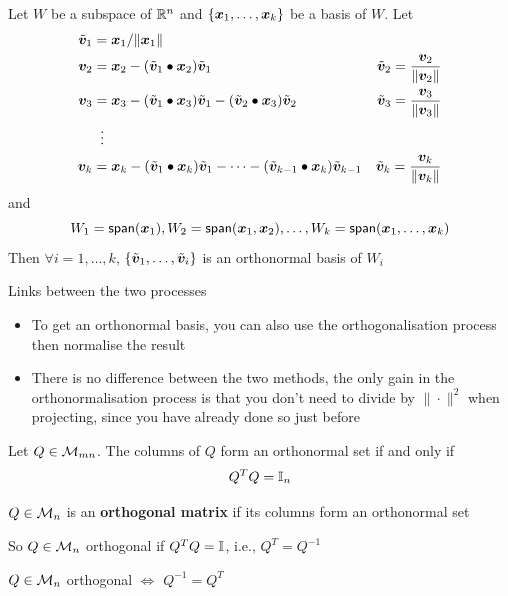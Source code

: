 \documentclass[aspectratio=169]{beamer}\usepackage[]{graphicx}\usepackage[]{xcolor}
\begin{document}
\begin{frame}
\begin{importanttheorem}
Let $W$ be a subspace of $\mathbb{R}^n$ and $\{\bm{x}_1,\ldots,\bm{x}_k\}$ be a basis of $W$. 
Let
\begin{align*}
\tilde{\bm{v}}_1 &= \bm{x}_1/\|\bm{x}_1\| \\
\bm{v}_2 &= \bm{x}_2 -(\tilde{\bm{v}}_1\bullet\bm{x}_2)\tilde{\bm{v}}_1  &
\tilde{\bm{v}}_2 = \frac{\bm{v}_2}{\|\bm{v}_2\|} \\
\bm{v}_3 &= \bm{x}_3 -(\tilde{\bm{v}}_1\bullet\bm{x}_3)\tilde{\bm{v}}_1 -(\tilde{\bm{v}}_2\bullet\bm{x}_3)\tilde{\bm{v}}_2 &
\tilde{\bm{v}}_3 = \frac{\bm{v}_3}{\|\bm{v}_3\|} \\
&\;\;\vdots & \\
\bm{v}_k &= \bm{x}_k -(\tilde{\bm{v}}_1\bullet\bm{x}_k)\tilde{\bm{v}}_1 
-\cdots-(\tilde{\bm{v}}_{k-1}\bullet\bm{x}_k)\tilde{\bm{v}}_{k-1}
& \tilde{\bm{v}}_k = \frac{\bm{v}_k}{\|\bm{v}_k\|}
\end{align*}
and
\[
W_1=\mathsf{span}(\bm{x}_1),W_2 = \mathsf{span}(\bm{x}_1,\bm{x}_2),\ldots,
W_k = \mathsf{span}(\bm{x}_1,\ldots,\bm{x}_k)
\]
Then $\forall i=1,\ldots,k$, $\{\tilde{\bm{v}}_1,\ldots,\tilde{\bm{v}}_i\}$ is an orthonormal basis of $W_i$
\end{importanttheorem}
\end{frame}

\begin{frame}{Links between the two processes}
\begin{itemize}
\item To get an orthonormal basis, you can also use the orthogonalisation process then normalise the result
\vfill
\item There is no difference between the two methods, the only gain in the orthonormalisation process is that you don't need to divide by $\|\cdot\|^2$ when projecting, since you have already done so just before
\end{itemize}
\end{frame}



\begin{frame}
\begin{importanttheorem}
Let $Q\in\mathcal{M}_{mn}$. The columns of $Q$ form an orthonormal set if and only if
\[
Q^TQ=\mathbb{I}_n
\]
\end{importanttheorem}
\vfill
\begin{importantdefinition}
$Q\in\mathcal{M}_n$ is an \textbf{orthogonal matrix} if its columns form an orthonormal set 
\end{importantdefinition}
So $Q\in\mathcal{M}_n$ orthogonal if $Q^TQ=\mathbb{I}$, i.e., $Q^T=Q^{-1}$
\vfill
\begin{importanttheorem}
$Q\in\mathcal{M}_n$ orthogonal $\iff$ $Q^{-1} = Q^T$
\end{importanttheorem}
\end{frame}
\end{document}
